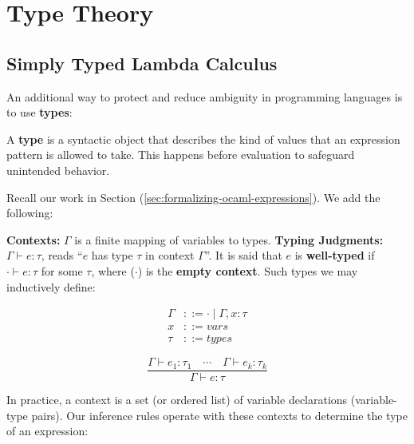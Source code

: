 \newpage 

\section{Type Theory}
\subsection{Simply Typed Lambda Calculus}

\noindent
An additional way to protect and reduce ambiguity in programming languages is to use \textbf{types}:

\begin{Def}[A Type]

    A \textbf{type} is a syntactic object that describes 
    the kind of values that an expression pattern is allowed to take.
    This happens before evaluation to safeguard unintended behavior.
\end{Def}

\noindent
Recall our work in Section (\ref{sec:formalizing-ocaml-expressions}). We add the following:

\begin{Def}

    \textbf{Contexts:} $\Gamma$ is a finite mapping of variables to types. \textbf{Typing Judgments:} $\Gamma \vdash e : \tau$, reads ``$e$ has type $\tau$ in context $\Gamma$''. It is 
    said that $e$ is \textbf{well-typed} if $\cdot \vdash e : \tau$ for some $\tau$, where ($\cdot$) is the \textbf{empty context}.
    Such types we may inductively define:\\
    \begin{minipage}{0.45\textwidth}
        \begin{align*}
            \Gamma &::= \cdot \mid \Gamma, x : \tau \\
            x &::= vars\\
            \tau &::= types
        \end{align*}
    \end{minipage}
    \hfill
    \begin{minipage}{0.45\textwidth}
        \[
        \frac{
          \Gamma \vdash e_1 : \tau_1 \quad \cdots \quad \Gamma \vdash e_k : \tau_k
        }{
          \Gamma \vdash e : \tau
        }
        \]
    \end{minipage}

    \vspace{.5em}
    \noindent
    In practice, a context is a set (or ordered list) of variable declarations (variable-type pairs). Our 
    inference rules operate with these contexts to determine the type of an expression:
\end{Def}


